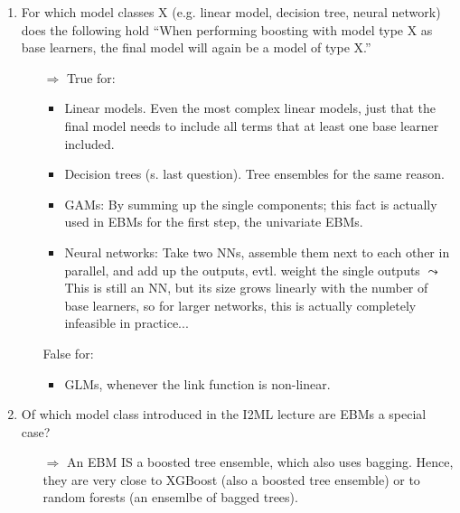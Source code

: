 \begin{enumerate}

    \item For which model classes X (e.g. linear model, decision tree, neural network) does the following hold ``When performing boosting with model type X as base learners, the final model will again be a model of type X.''
    \begin{itemize}
        \item[$\Rightarrow$]
        True for:
        \begin{itemize}
            \item Linear models. Even the most complex linear models, just that the final model needs to include all terms that at least one base learner included.
            \item Decision trees (s. last question). Tree ensembles for the same reason.
            \item GAMs: By summing up the single components; this fact is actually used in EBMs for the first step, the univariate EBMs.
            \item Neural networks: Take two NNs, assemble them next to each other in parallel, and add up the outputs, evtl. weight the single outputs $\leadsto$ This is still an NN, but its size grows linearly with the number of base learners, so for larger networks, this is actually completely infeasible in practice...
        \end{itemize}
        False for:
        \begin{itemize}
            \item GLMs, whenever the link function is non-linear.
        \end{itemize}
    \end{itemize}

    \item Of which model class introduced in the I2ML lecture are EBMs a special case?
    \begin{itemize}
        \item[$\Rightarrow$]
        An EBM IS a boosted tree ensemble, which also uses bagging.
        Hence, they are very close to XGBoost (also a boosted tree ensemble) or to random forests (an ensemlbe of bagged trees).
    \end{itemize}


\end{enumerate}
